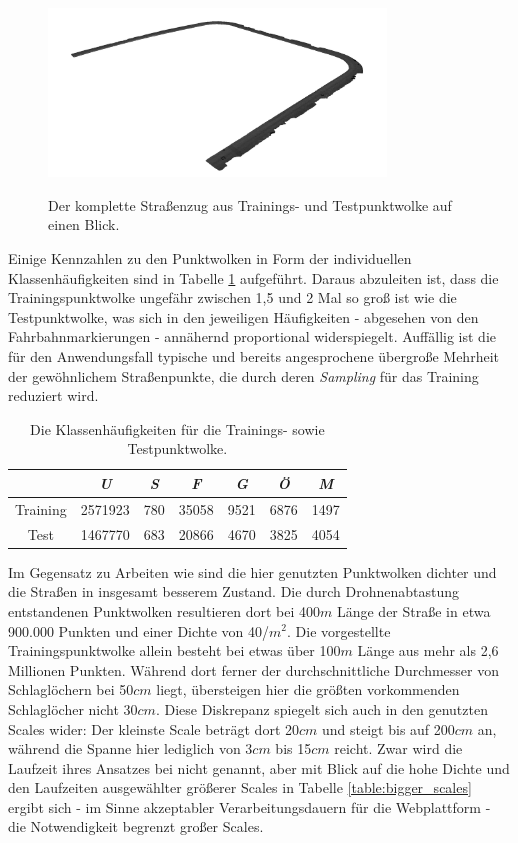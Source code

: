 \begin{figure}
    {\includegraphics[width=0.8\textwidth]{graphics/full_both}}
    \caption{Der komplette Straßenzug aus Trainings- und Testpunktwolke auf einen Blick.}
    \label{fig:train_test_pcs}
\end{figure}

Einige Kennzahlen zu den Punktwolken in Form der individuellen Klassenhäufigkeiten sind in Tabelle \ref{table:class_frequencies} aufgeführt. Daraus abzuleiten ist, dass die Trainingspunktwolke ungefähr zwischen 1,5 und 2 Mal so groß ist wie die Testpunktwolke, was sich in den jeweiligen Häufigkeiten - abgesehen von den Fahrbahnmarkierungen - annähernd proportional widerspiegelt. Auffällig ist die für den Anwendungsfall typische und bereits angesprochene übergroße Mehrheit der gewöhnlichem Straßenpunkte, die durch deren \textit{Sampling} für das Training reduziert wird. \\

\begin{table}
\centering
\begin{tabular}{c|c|c|c|c|c|c}
 & \textit{U} & \textit{S} & \textit{F} & \textit{G} & \textit{Ö} & \textit{M} \\
\hline
Training & 2571923 & 780 & 35058 & 9521 & 6876 & 1497 \\
Test     & 1467770 & 683 & 20866 & 4670 & 3825 & 4054 \\
\end{tabular}
\caption{Die Klassenhäufigkeiten für die Trainings- sowie Testpunktwolke.}
\label{table:class_frequencies}
\end{table}

Im Gegensatz zu Arbeiten wie \cite{Zhiqiang.etal-2019} sind die hier genutzten Punktwolken dichter und die Straßen in insgesamt besserem Zustand. Die durch Drohnenabtastung entstandenen Punktwolken resultieren dort bei 400$m$ Länge der Straße in etwa 900.000 Punkten und einer Dichte von 40/$m^2$. Die vorgestellte Trainingspunktwolke allein besteht bei etwas über 100$m$ Länge aus mehr als 2,6 Millionen Punkten. Während dort ferner der durchschnittliche Durchmesser von Schlaglöchern bei 50$cm$ liegt, übersteigen hier die größten vorkommenden Schlaglöcher nicht 30$cm$. Diese Diskrepanz spiegelt sich auch in den genutzten Scales wider: Der kleinste Scale beträgt dort 20$cm$ und steigt bis auf 200$cm$ an, während die Spanne hier lediglich von 3$cm$ bis 15$cm$ reicht. Zwar wird die Laufzeit ihres Ansatzes bei \cite{Zhiqiang.etal-2019} nicht genannt, aber mit Blick auf die hohe Dichte und den Laufzeiten ausgewählter größerer Scales in Tabelle \ref{table:bigger_scales} ergibt sich - im Sinne akzeptabler Verarbeitungsdauern für die Webplattform - die Notwendigkeit begrenzt großer Scales.

